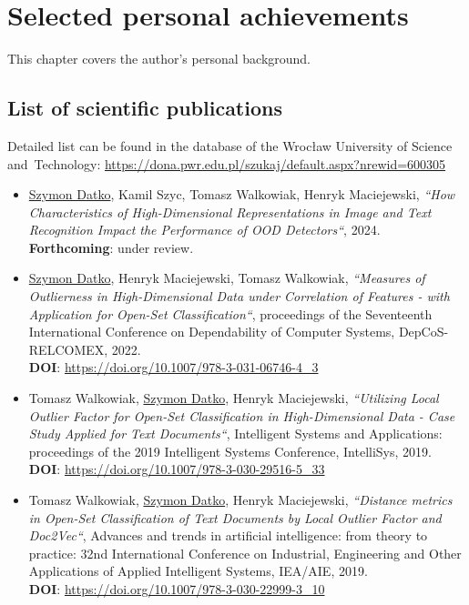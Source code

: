 \chapter{Selected personal achievements}
\label{chapter:achievements}

This chapter covers the author's personal background.


\section{List of scientific publications}
\label{section:publications}

Detailed list can be found in the database of the Wrocław University of Science and~Technology: \url{https://dona.pwr.edu.pl/szukaj/default.aspx?nrewid=600305}

\begin{itemize}
    \item
        \underline{Szymon Datko}, Kamil Szyc, Tomasz Walkowiak, Henryk Maciejewski,
        \textit{“How Characteristics of High-Dimensional Representations in Image and Text Recognition Impact the Performance of OOD Detectors“}, 2024.\\
        \textbf{Forthcoming}: under review.

    \item
        \underline{Szymon Datko}, Henryk Maciejewski, Tomasz Walkowiak,
        \textit{“Measures of Outlierness in High-Dimensional Data under Correlation of Features - with Application for Open-Set Classification“},
        proceedings of the Seventeenth International Conference on Dependability of Computer Systems, DepCoS-RELCOMEX, 2022.\\
        \textbf{DOI}: \url{https://doi.org/10.1007/978-3-031-06746-4_3}

    \item
        Tomasz Walkowiak, \underline{Szymon Datko}, Henryk Maciejewski,
        \textit{“Utilizing Local Outlier Factor for Open-Set Classification in High-Dimensional Data - Case Study Applied for Text Documents“},
        Intelligent Systems and Applications: proceedings of the 2019 Intelligent Systems Conference, IntelliSys, 2019.\\
        \textbf{DOI}: \url{https://doi.org/10.1007/978-3-030-29516-5_33}

    \item
        Tomasz Walkowiak, \underline{Szymon Datko}, Henryk Maciejewski,
        \textit{“Distance metrics in Open-Set Classification of Text Documents by Local Outlier Factor and Doc2Vec“},
        Advances and trends in artificial intelligence: from theory to practice: 32nd International Conference on Industrial, Engineering and Other Applications of Applied Intelligent Systems, IEA/AIE, 2019.\\
        \textbf{DOI}: \url{https://doi.org/10.1007/978-3-030-22999-3_10}


\end{itemize}
